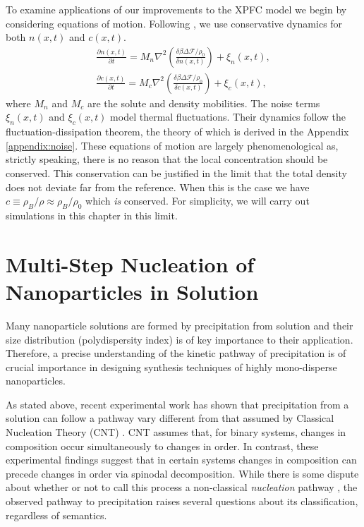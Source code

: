 \documentclass[showkeys, prb, reprint]{revtex4-1}
\renewcommand{\d}{\delta}       %
\newcommand{\F}{\mathcal{F}}    %
\renewcommand{\l}{\left}        %
\renewcommand{\r}{\right}       %
\newcommand{\f}{\frac}          %
\newcommand{\B}{\rho_B}         %
\begin{document}
To examine applications of our improvements to the XPFC model we begin by
considering equations of motion. Following \cite{GREENWOOD11_BINARY}, we use
conservative dynamics for both $n(x, t)$ and $c(x, t)$.
%
\begin{gather}
    \f{\partial n(x, t)}{\partial t} = 
        M_n \nabla^2\l(\f{\d \beta \Delta\F / \rho_0}{\d n(x, t)}\r) 
        + \xi_n(x, t), \\ 
    \f{\partial c(x, t)}{\partial t} = 
        M_c \nabla^2\l(\f{\d \beta \Delta \F / \rho_0}{\d c(x, t)}\r)
        + \xi_c(x, t),
\end{gather}
%
where $M_n$ and $M_c$ are the solute and density mobilities. The noise terms
$\xi_n(x, t)$ and $\xi_c(x, t)$ model thermal fluctuations. Their dynamics
follow the fluctuation-dissipation theorem, the theory of which is derived in
the Appendix \ref{appendix:noise}. These equations of motion are largely
phenomenological as, strictly speaking, there is no reason that the local
concentration should be conserved.  This conservation can be justified in the
limit that the total density does not deviate far from the reference. When this
is the case we have $c \equiv \B / \rho \approx \B / \rho_0$ which \textit{is}
conserved. For simplicity, we will carry out simulations in this chapter in
this limit.

\section{Multi-Step Nucleation of Nanoparticles in Solution} %


Many nanoparticle solutions are formed by precipitation from solution and their
size distribution (polydispersity index) is of key importance to their
application. Therefore, a precise understanding of the kinetic pathway of
precipitation is of crucial importance in designing synthesis techniques of
highly mono-disperse nanoparticles.

As stated above, recent experimental work has shown that precipitation from a
solution can follow a pathway vary different from that assumed by Classical
Nucleation Theory (CNT) \cite{LOH17, WALLACE13}. CNT assumes that, for binary
systems, changes in composition occur simultaneously to changes in order. In
contrast, these experimental findings suggest that in certain systems changes
in composition can precede changes in order via spinodal decomposition. While
there is some dispute about whether or not to call this process a non-classical
\textit{nucleation} pathway \cite{DAVEY13, GEBAUER11}, the observed pathway to
precipitation raises several questions about its classification, regardless of
semantics.
\end{document}
